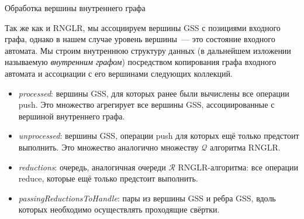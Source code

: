 \begin{algorithm}[H]
\begin{algorithmic}[1]
\caption{Обработка вершины внутреннего графа}
\label{processVertex}
    \EndFor
  \EndFor
\EndFunction

    \EndFor
  \EndWhile
\EndFunction

      \EndFor
    \EndFor
  \EndFor
\EndFunction
\end{algorithmic}
\end{algorithm}

Так же как и RNGLR, мы ассоциируем вершины GSS с позициями входного графа, однако в нашем случае уровень вершины~--- это состояние входного автомата. Мы строим внутреннюю структуру данных (в дальнейшем изложении называемую \emph{внутренним графом}) посредством копирования графа входного автомата и ассоциации с его вершинами следующих коллекций.
\begin{itemize}
  \item \emph{processed}: вершины GSS, для которых ранее были вычислены все операции push. Это множество агрегирует все вершины GSS, ассоциированные с вершиной внутреннего графа.
  \item \emph{unprocessed}: вершины GSS, операции push для которых ещё только предстоит выполнить. Это множество аналогично множеству $\mathcal{Q}$ алгоритма RNGLR.
  \item \emph{reductions}: очередь, аналогичная очереди $\mathcal{R}$ RNGLR-алгоритма: все операции reduce, которые ещё только предстоит выполнить.
  \item \emph{passingReductionsToHandle}: пары из вершины GSS и ребра GSS, вдоль которых необходимо осуществлять проходящие свёртки.
\end{itemize}

